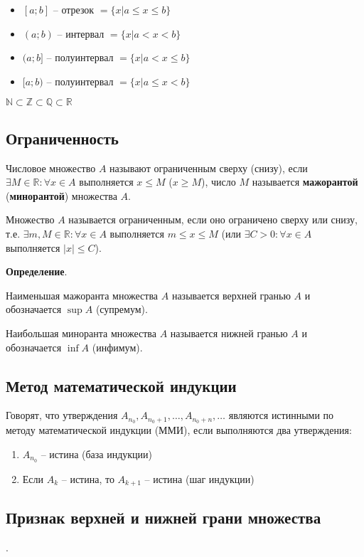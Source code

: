 \documentclass{article}
\begin{document}
\begin{itemize}
    \item $[a;b]$ -- отрезок $= \{x | a \le x \le b\}$
    \item $(a;b)$ -- интервал $= \{x | a < x < b\}$
    \item $(a;b]$ -- полуинтервал $= \{x | a < x \le b\}$
    \item $[a;b)$ -- полуинтервал $= \{x | a \le x < b\}$
\end{itemize}

$\mathbb{N} \subset \mathbb{Z} \subset \mathbb{Q} \subset \mathbb{R}$

\subsection{Ограниченность}

Числовое множество $A$ называют ограниченным сверху (снизу), если 
$\exists M \in \mathbb{R}: \forall x \in A$ выполняется $x \le M$ ($x \ge M$),
число $M$ называется \textbf{мажорантой} (\textbf{минорантой}) множества $A$.

Множество $A$ называется ограниченным, если оно ограничено сверху или снизу,
т.е. $\exists m, M \in \mathbb{R}: \forall x \in A$ выполняется $m \le x \le M$
(или $\exists C > 0: \forall x \in A$ выполняется $|x| \le C$).

\textbf{Определение}.

Наименьшая мажоранта множества $A$ называется верхней гранью $A$ и обозначается
$\sup A$ (супремум).

Наибольшая миноранта множества $A$ называется нижней гранью $A$ и обозначается
$\inf A$ (инфимум).

\subsection{Метод математической индукции}

Говорят, что утверждения $A_{n_0}, A_{n_0 + 1}, \dots, A_{n_0 + n}, \dots$ являются
истинными по методу математической индукции (ММИ), если выполняются два утверждения:
\begin{enumerate}
    \item $A_{n_0}$ -- истина (база индукции)
    \item Если $A_k$ -- истина, то $A_{k+1}$ -- истина (шаг индукции)
\end{enumerate}

\subsection{Признак верхней и нижней грани множества}.
\end{document}
